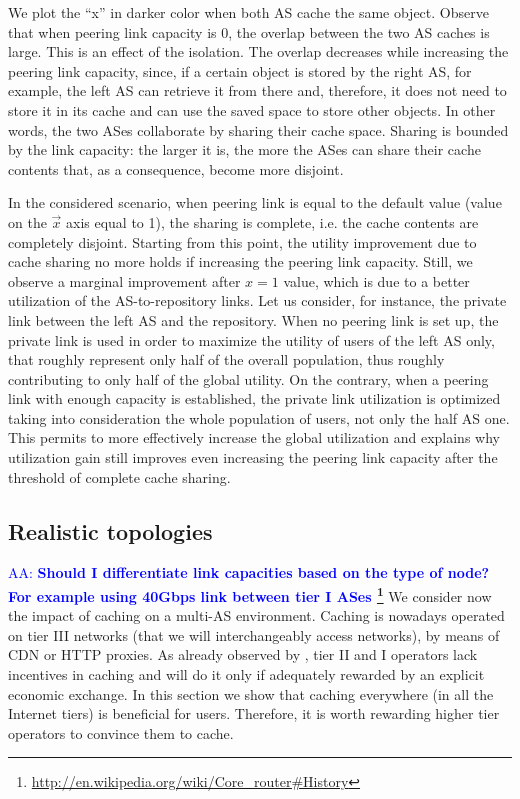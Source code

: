 \documentclass[10pt, journal,letterpaper]{IEEEtran}
\newcommand{\AAra}[1]{\textcolor{blue}{AA: \bf #1}}
\begin{document}
We plot the ``x'' in darker color when both AS cache the same object. Observe that when peering link capacity is 0, the overlap between the two AS caches is large. This is an effect of the isolation. The overlap decreases while increasing the peering link capacity, since, if a certain object is stored by the right AS, for example, the left AS can retrieve it from there and, therefore, it does not need to store it in its cache and can use the saved space to store other objects. In other words, the two ASes collaborate by sharing their cache space. Sharing is bounded by the link capacity: the larger it is, the more the ASes can share their cache contents that, as a consequence, become more disjoint.

In the considered scenario, when peering link is equal to the default value (value on the $\vec x$ axis equal to 1), the sharing is complete, i.e. the cache contents are completely disjoint. Starting from this point, the utility improvement due to cache sharing no more holds if increasing the peering link capacity. Still, we observe a marginal improvement after $x=1$ value, which is due to a better utilization of the AS-to-repository links. Let us consider, for instance, the private link between the left AS and the repository. When no peering link is set up, the private link is used in order to maximize the utility of users of the left AS only, that roughly represent only half of the overall population, thus roughly contributing to only half of the global utility. On the contrary, when a peering link with enough capacity is established, the private link utilization is optimized taking into consideration the whole population of users, not only the half AS one. This permits to more effectively increase the global utilization and explains why utilization gain still improves even increasing the peering link capacity after the threshold of complete cache sharing.

\subsection{Realistic topologies}
\AAra{Should I differentiate link capacities based on the type of node? For example using 40Gbps link between tier I ASes \footnote{\url{http://en.wikipedia.org/wiki/Core_router#History} } }
We consider now the impact of caching on a multi-AS environment. Caching is nowadays operated on tier III networks (that we will interchangeably access networks), by means of CDN or HTTP proxies. As already observed by \cite{Agyapong2012}, tier II and I operators lack incentives in caching and will do it only if adequately rewarded by an explicit economic exchange. In this section we show that caching everywhere (in all the Internet tiers) is beneficial for users. Therefore, it is worth rewarding higher tier operators to convince them to cache.
\end{document}
